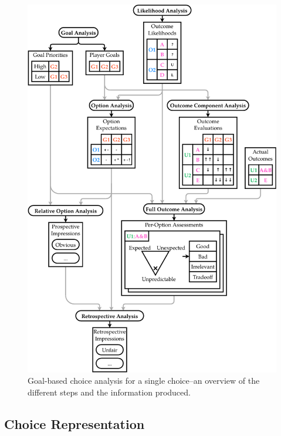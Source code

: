 \begin{figure}[!p]
\centering
\includegraphics[height=0.92\textheight]{fig/analysis-method-crop.pdf}
\caption[Choice analysis flowchart]{Goal-based choice analysis for a single choice--an overview of the different steps and the information produced.}
\label{fig:choice-analysis-method}
\end{figure}


\subsection{Choice Representation}

\label{sec:cp-choice-representation}

